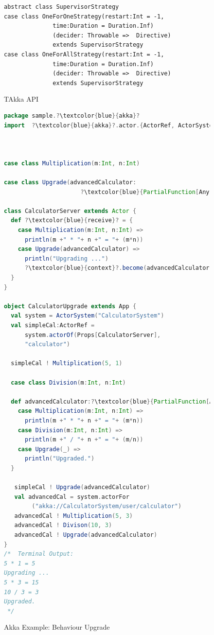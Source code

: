 \begin{figure}[!h]
    \begin{lstlisting}    
abstract class SupervisorStrategy
case class OneForOneStrategy(restart:Int = -1, 
              time:Duration = Duration.Inf)
              (decider: Throwable =>  Directive) 
              extends SupervisorStrategy
case class OneForAllStrategy(restart:Int = -1, 
              time:Duration = Duration.Inf)
              (decider: Throwable =>  Directive) 
              extends SupervisorStrategy
    \end{lstlisting}
    
    \caption{TAkka API}
\end{figure}


\begin{figure}[!h]
\begin{lstlisting}[language=scala,  escapechar=?]
package sample.?\textcolor{blue}{akka}?
import  ?\textcolor{blue}{akka}?.actor.{ActorRef, ActorSystem, Props, Actor}



case class Multiplication(m:Int, n:Int)

case class Upgrade(advancedCalculator:
                      ?\textcolor{blue}{PartialFunction[Any,Unit])}?

class CalculatorServer extends Actor { 
  def ?\textcolor{blue}{receive}? = {
    case Multiplication(m:Int, n:Int) => 
      println(m +" * "+ n +" = "+ (m*n))
    case Upgrade(advancedCalculator) =>
      println("Upgrading ...")
      ?\textcolor{blue}{context}?.become(advancedCalculator)    
  }
}

object CalculatorUpgrade extends App {
  val system = ActorSystem("CalculatorSystem") 
  val simpleCal:ActorRef = 
      system.actorOf(Props[CalculatorServer], 
      "calculator")
    
  simpleCal ! Multiplication(5, 1)
  
  case class Division(m:Int, n:Int) 
   
  def advancedCalculator:?\textcolor{blue}{PartialFunction[Any,Unit]}? = {
    case Multiplication(m:Int, n:Int) => 
      println(m +" * "+ n +" = "+ (m*n))
    case Division(m:Int, n:Int) => 
      println(m +" / "+ n +" = "+ (m/n))
    case Upgrade(_) =>
      println("Upgraded.")
  }  
     
   simpleCal ! Upgrade(advancedCalculator)    
   val advancedCal = system.actorFor
   		("akka://CalculatorSystem/user/calculator")   
   advancedCal ! Multiplication(5, 3)
   advancedCal ! Divison(10, 3)
   advancedCal ! Upgrade(advancedCalculator)
}
/*  Terminal Output:
5 * 1 = 5
Upgrading ...
5 * 3 = 15
10 / 3 = 3
Upgraded.
 */
\end{lstlisting}
  \caption{Akka Example: Behaviour Upgrade}
  \label{fig:akka_swap} 
  \vspace{-10pt }
\end{figure}

